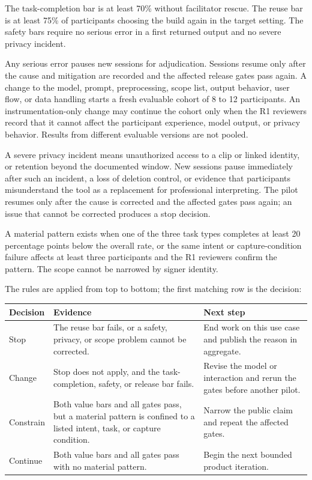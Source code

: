 \documentclass[11pt]{article}
\begin{document}
The task-completion bar is at least 70\% without facilitator rescue. The reuse bar is
at least 75\% of participants choosing the build again in the target setting. The
safety bars require no serious error in a first returned output and no severe privacy
incident.

Any serious error pauses new sessions for adjudication. Sessions resume only after
the cause and mitigation are recorded and the affected release gates pass again.
A change to the model, prompt, preprocessing, scope list, output behavior, user flow,
or data handling starts a fresh evaluable cohort of 8 to 12 participants. An
instrumentation-only change may continue the cohort only when the R1 reviewers record
that it cannot affect the participant experience, model output, or privacy behavior.
Results from different evaluable versions are not pooled.

A severe privacy incident means unauthorized access to a clip or linked identity, or
retention beyond the documented window. New sessions pause immediately after such an
incident, a loss of deletion control, or evidence that participants misunderstand the
tool as a replacement for professional interpreting. The pilot resumes only after the
cause is corrected and the affected gates pass again; an issue that cannot be
corrected produces a stop decision.

A material pattern exists when one of the three task types completes at least 20
percentage points below the overall rate, or the same intent or capture-condition
failure affects at least three participants and the R1 reviewers confirm the pattern.
The scope cannot be narrowed by signer identity.

\Needspace{0.34\textheight}
The rules are applied from top to bottom; the first matching row is the decision:

\begin{center}
\begin{tabularx}{\textwidth}{@{}P{2.2cm}YY@{}}
\toprule
Decision & Evidence & Next step \\
\midrule
Stop & The reuse bar fails, or a safety, privacy, or scope problem cannot be corrected.
& End work on this use case and publish the reason in aggregate. \\
Change & Stop does not apply, and the task-completion, safety, or release bar fails. &
Revise the model or interaction and rerun the gates before another pilot. \\
Constrain & Both value bars and all gates pass, but a material pattern is confined to
a listed intent, task, or capture condition. & Narrow the public claim and repeat the
affected gates. \\
Continue & Both value bars and all gates pass with no material pattern. & Begin the
next bounded product iteration. \\
\bottomrule
\end{tabularx}
\end{center}
\end{document}
